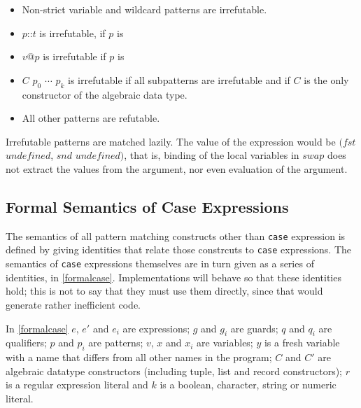 \begin{itemize}
\item Non-strict variable and wildcard patterns are irrefutable.
\item $p$::$t$ is irrefutable, if $p$ is
\item $v$@$p$ is irrefutable if $p$ is
\item $C$ $p_0$ $\cdots$ $p_k$ is irrefutable if all subpatterns are irrefutable and if $C$ is the only constructor of the algebraic data type.
\item All other patterns are refutable.
\end{itemize}

Irrefutable patterns are matched lazily. The value of the expression
would be $(fst$ $undefined$, $snd$ $undefined)$, that is, binding of the local variables in $swap$ does not extract the values from the argument, nor even evaluation of the argument.


\subsection{Formal Semantics of Case Expressions}

The semantics of all pattern matching constructs other than \texttt{case} expression is defined by giving identities that relate those constrcuts to \texttt{case} expressions. The semantics of \texttt{case} expressions themselves are in turn given as a series of identities, in \autoref{formalcase}. Implementations will behave so that these identities hold; this is not to say that they must use them directly, since that would generate rather inefficient code.

In \autoref{formalcase} $e$, $e'$ and $e_i$ are expressions; $g$ and $g_i$ are guards; $q$ and $q_i$ are qualifiers; $p$ and  $p_i$ are patterns; $v$, $x$ and $x_i$ are variables; $y$ is a fresh variable with a name that differs from all other names in the program; $C$ and $C'$ are algebraic datatype constructors (including tuple, list and record constructors); $r$ is a regular expression literal and $k$ is a boolean, character, string or numeric literal.

